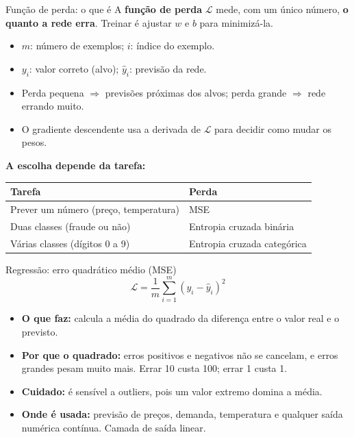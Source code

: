 \documentclass[10pt]{beamer}
\begin{document}
\begin{frame}{Função de perda: o que é}
A \textbf{função de perda} $\mathcal{L}$ mede, com um único número, \textbf{o quanto a rede erra}. Treinar é ajustar $w$ e $b$ para minimizá-la.
\begin{itemize}
 \item $m$: número de exemplos; $i$: índice do exemplo.
 \item $y_i$: valor correto (alvo); $\hat y_i$: previsão da rede.
 \item Perda pequena $\Rightarrow$ previsões próximas dos alvos; perda grande $\Rightarrow$ rede errando muito.
 \item O gradiente descendente usa a derivada de $\mathcal{L}$ para decidir como mudar os pesos.
\end{itemize}
\textbf{A escolha depende da tarefa:}
\begin{center}\small
\begin{tabular}{@{}ll@{}}
\toprule
Tarefa & Perda \\
\midrule
Prever um número (preço, temperatura) & MSE \\
Duas classes (fraude ou não) & Entropia cruzada binária \\
Várias classes (dígitos 0 a 9) & Entropia cruzada categórica \\
\bottomrule
\end{tabular}
\end{center}
\end{frame}

\begin{frame}{Regressão: erro quadrático médio (MSE)}
\[ \mathcal{L}=\frac{1}{m}\sum_{i=1}^m(y_i-\hat{y}_i)^2 \]
\begin{itemize}
 \item \textbf{O que faz:} calcula a média do quadrado da diferença entre o valor real e o previsto.
 \item \textbf{Por que o quadrado:} erros positivos e negativos não se cancelam, e erros grandes pesam muito mais. Errar 10 custa 100; errar 1 custa 1.
 \item \textbf{Cuidado:} é sensível a outliers, pois um valor extremo domina a média.
 \item \textbf{Onde é usada:} previsão de preços, demanda, temperatura e qualquer saída numérica contínua. Camada de saída linear.
\end{itemize}
\end{frame}
\end{document}
